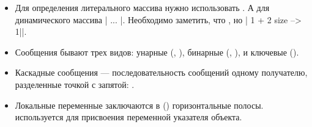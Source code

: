 \documentclass[a4paper,10pt,twoside]{book}
\begin{document}
\begin{itemize}

\item	Для определения литерального массива нужно использовать .
	А для динамического массива \ct|{ ... }|.
	Необходимо заметить, что ,
	но \ct|{ 1 + 2 } size --> 1||.


\item 	Сообщения бывают трех видов:
	унарные (, ),
	бинарные (, ),
	и ключевые ().

\item 	Каскадные сообщения --- последовательность сообщений одному получателю, разделенные точкой с запятой:
	.


\item 	Локальные переменные заключаются в (\ct{|}) горизонтальные полосы.
	\ct{:=} используется для присвоения переменной указателя объекта.



\end{itemize}
\end{document}
